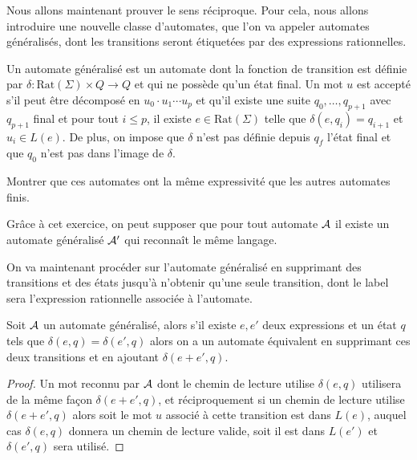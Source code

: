  Nous allons maintenant prouver le sens réciproque. Pour cela, nous allons introduire une nouvelle classe d'automates, que l'on va appeler automates généralisés, dont les transitions seront étiquetées par des expressions rationnelles.

 \begin{defi}
     Un automate généralisé est un automate dont la fonction de transition est définie par $\delta : \mathrm{Rat}(\Sigma)\times Q \to Q$ et qui ne possède qu'un état final. Un mot $u$ est accepté s'il peut être décomposé en $u_0\cdot u_1\cdots u_p$ et qu'il existe une suite $q_0,\ldots,q_{p+1}$ avec $q_{p+1}$ final et pour tout $i\leq p$, il existe $e\in\mathrm{Rat}(\Sigma)$ telle que $\delta(e,q_i)=q_{i+1}$ et $u_i\in L(e)$. De plus, on impose que $\delta$ n'est pas définie depuis $q_f$ l'état final et que $q_0$ n'est pas dans l'image de $\delta$.
 \end{defi}

 \begin{exo}
     Montrer que ces automates ont la même expressivité que les autres automates finis.
 \end{exo}

 \begin{rmk}
     Grâce à cet exercice, on peut supposer que pour tout automate $\mathcal A$ il existe un automate généralisé $\mathcal A'$ qui reconnaît le même langage.
 \end{rmk}

On va maintenant procéder sur l'automate généralisé en supprimant des transitions et des états jusqu'à n'obtenir qu'une seule transition, dont le label sera l'expression rationnelle associée à l'automate.

\begin{lem}
    Soit $\mathcal A$ un automate généralisé, alors s'il existe $e,e'$ deux expressions et un état $q$ tels que $\delta(e,q)=\delta(e',q)$ alors on a un automate équivalent en supprimant ces deux transitions et en ajoutant $\delta(e+e',q)$.
\end{lem}

\begin{proof}
    Un mot reconnu par $\mathcal A$ dont le chemin de lecture utilise $\delta(e,q)$ utilisera de la même façon $\delta(e+e',q)$, et réciproquement si un chemin de lecture utilise $\delta(e+e',q)$ alors soit le mot $u$ associé à cette transition est dans $L(e)$, auquel cas $\delta(e,q)$ donnera un chemin de lecture valide, soit il est dans $L(e')$ et $\delta(e',q)$ sera utilisé.
\end{proof}

